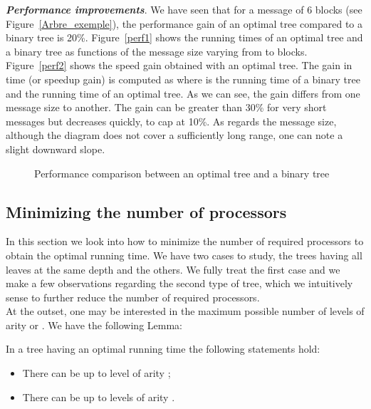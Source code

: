 \documentclass{llncs}
\renewcommand{\paragraph}[1]{\noindent\textit{#1}.}
\begin{document}
\paragraph{\textbf{Performance improvements}}
We have seen that for a message of 6 blocks (see Figure~\ref{Arbre_exemple}), the performance gain of an optimal tree compared to a binary tree is 20\%.
Figure~\ref{perf1} shows the running times of an optimal tree and a binary tree as functions of the message size varying from  to  blocks. 
Figure~\ref{perf2} shows the speed gain obtained with an optimal tree. 
The gain in time (or speedup gain) 
is computed as  where  is the running time of a binary tree and  the running time of an optimal tree. 
As we can see, the gain differs from one message size to another. The gain can be greater than 30\% for very short messages
but decreases quickly, to cap at 10\%. 
As regards the message size, although the diagram
does not cover a sufficiently long range, one can note a slight downward slope. 
\begin{figure}[htb]
\centering
{}


\caption{Performance comparison between an optimal tree and a binary tree}
\label{Gains_execution}
\end{figure}

\subsection{Minimizing the number of processors}\label{subsec:proce}

In this section we look into how to minimize the number of required processors to obtain the optimal running time.
We have two cases to study, the trees having all leaves at the same depth and the others. 
We fully treat the first case and we make a few observations regarding the second type of tree, 
which we intuitively sense to further reduce the number of required processors.~\\

At the outset, one may be interested in the maximum possible number of levels of arity  or . We have the following Lemma:

\begin{lemma}\label{numb_ar_4_and_5}
In a tree having an optimal running time the following statements hold:
\begin{itemize}
 \item There can be up to  level of arity ; 
 \item There can be up to  levels of arity .
\end{itemize}
\end{lemma}
\end{document}
